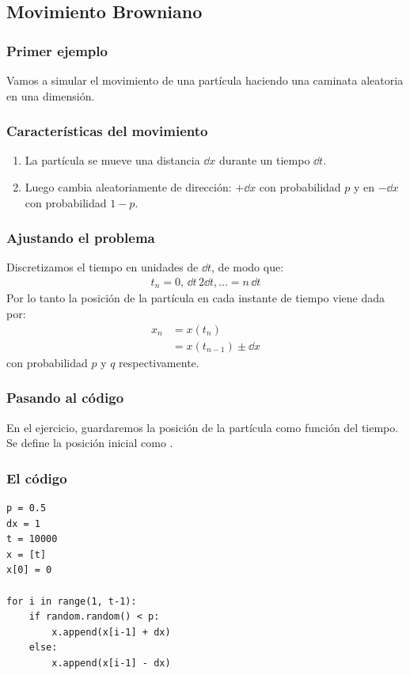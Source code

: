 \documentclass[12pt]{beamer}
\begin{document}
\subsection{Movimiento Browniano}

\begin{frame}
\frametitle{Primer ejemplo}
Vamos a simular el movimiento de una partícula haciendo una caminata aleatoria en una dimensión.
\end{frame}
\begin{frame}
\frametitle{Características del movimiento}
\begin{enumerate}[<+->]
\item La partícula se mueve una distancia $\dd{x}$ durante un tiempo $\dd{t}$.
\item Luego cambia aleatoriamente de dirección: $+\dd{x}$ con probabilidad $p$ y en $-\dd{x}$ con probabilidad $1 - p$.
\end{enumerate}
\end{frame}
\begin{frame}
\frametitle{Ajustando el problema}
Discretizamos el tiempo en unidades de $\dd{t}$, de modo que:
\pause
\begin{align*}
t_{n} = 0, \, \dd{t} \, 2 \dd{t} , \ldots = n \, \dd{t}
\end{align*}
\pause
Por lo tanto la posición de la partícula en cada instante de tiempo viene dada por:
\begin{align*}
x_{n} &= x (t_{n}) \\
& = x (t_{n-1}) \pm \dd{x}
\end{align*}
con probabilidad $p$ y $q$ respectivamente.
\end{frame}
\begin{frame}
\frametitle{Pasando al código}
En el ejercicio, guardaremos la posición de la partícula como función del tiempo.
\\
\bigskip
\pause
Se define la posición inicial como .
\end{frame}
\begin{frame}
\frametitle{El código}
\begin{lstlisting}[caption=Código para la caminata aleatoria]
p = 0.5
dx = 1
t = 10000
x = [t]
x[0] = 0

for i in range(1, t-1):
    if random.random() < p:
        x.append(x[i-1] + dx)
    else:
        x.append(x[i-1] - dx)
\end{lstlisting}
\end{frame}
\end{document}
